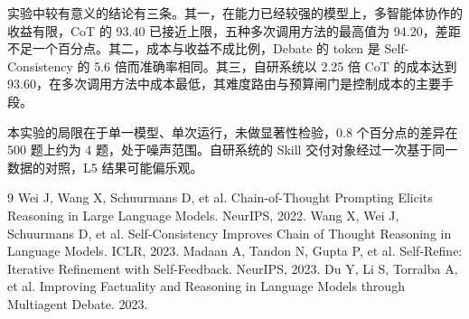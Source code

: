 \documentclass[12pt]{ctexart}
\begin{document}
实验中较有意义的结论有三条。其一，在能力已经较强的模型上，多智能体协作的收益有限，CoT 的 93.40 已接近上限，五种多次调用方法的最高值为 94.20，差距不足一个百分点。其二，成本与收益不成比例，Debate 的 token 是 Self-Consistency 的 5.6 倍而准确率相同。其三，自研系统以 2.25 倍 CoT 的成本达到 93.60，在多次调用方法中成本最低，其难度路由与预算闸门是控制成本的主要手段。

本实验的局限在于单一模型、单次运行，未做显著性检验，0.8 个百分点的差异在 500 题上约为 4 题，处于噪声范围。自研系统的 Skill 交付对象经过一次基于同一数据的对照，L5 结果可能偏乐观。

\begin{thebibliography}{9}
 Wei J, Wang X, Schuurmans D, et al. Chain-of-Thought Prompting Elicits Reasoning in Large Language Models. NeurIPS, 2022.
 Wang X, Wei J, Schuurmans D, et al. Self-Consistency Improves Chain of Thought Reasoning in Language Models. ICLR, 2023.
 Madaan A, Tandon N, Gupta P, et al. Self-Refine: Iterative Refinement with Self-Feedback. NeurIPS, 2023.
 Du Y, Li S, Torralba A, et al. Improving Factuality and Reasoning in Language Models through Multiagent Debate. 2023.
\end{thebibliography}
\end{document}
